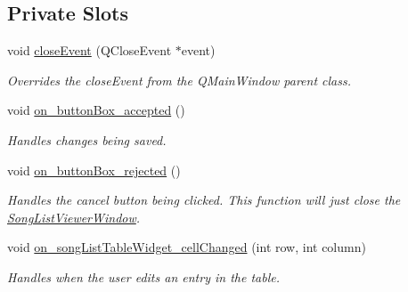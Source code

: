 \subsection*{Private Slots}
\begin{DoxyCompactItemize}
\item 
void \mbox{\hyperlink{class_song_list_viewer_window_ad5f7f01b35b12fefb932fa8e10a83851}{close\+Event}} (Q\+Close\+Event $\ast$event)
\begin{DoxyCompactList}\small\item\em Overrides the close\+Event from the Q\+Main\+Window parent class. \end{DoxyCompactList}\item 
void \mbox{\hyperlink{class_song_list_viewer_window_a8f8a21788c5f078302abe140bf80ac4c}{on\+\_\+button\+Box\+\_\+accepted}} ()
\begin{DoxyCompactList}\small\item\em Handles changes being saved. \end{DoxyCompactList}\item 
void \mbox{\hyperlink{class_song_list_viewer_window_a6ba5d2cc5443329cf53bb4b20759af12}{on\+\_\+button\+Box\+\_\+rejected}} ()
\begin{DoxyCompactList}\small\item\em Handles the cancel button being clicked. This function will just close the \mbox{\hyperlink{class_song_list_viewer_window}{Song\+List\+Viewer\+Window}}. \end{DoxyCompactList}\item 
void \mbox{\hyperlink{class_song_list_viewer_window_a51be8e61dee777db1408d4cd7da57070}{on\+\_\+song\+List\+Table\+Widget\+\_\+cell\+Changed}} (int row, int column)
\begin{DoxyCompactList}\small\item\em Handles when the user edits an entry in the table. \end{DoxyCompactList}\end{DoxyCompactItemize}
